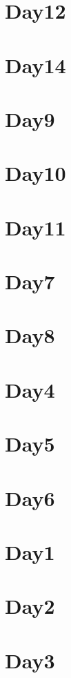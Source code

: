 
\section*{Day12}

\vfill
\section*{Day14}

\vfill
\section*{Day9}

\vfill
\section*{Day10}

\vfill
\section*{Day11}

\vfill
\section*{Day7}

\vfill
\section*{Day8}

\vfill
\section*{Day4}

\vfill
\section*{Day5}

\vfill
\section*{Day6}

\vfill
\section*{Day1}

\vfill
\section*{Day2}

\vfill
\section*{Day3}

\vfill
